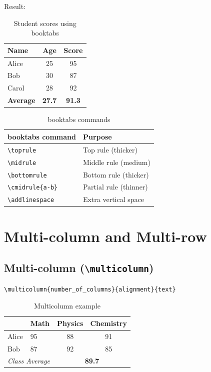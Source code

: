 Result:
\begin{table}[H]
\centering
\begin{tabular}{lcc}
\toprule
\textbf{Name}  & \textbf{Age} & \textbf{Score} \\
\midrule
Alice & 25  & 95 \\
Bob   & 30  & 87 \\
Carol & 28  & 92 \\
\midrule
\textbf{Average} & \textbf{27.7} & \textbf{91.3} \\
\bottomrule
\end{tabular}
\caption{Student scores using booktabs}
\end{table}

\begin{table}[H]
\centering
\begin{tabular}{ll}
\toprule
\textbf{booktabs command} & \textbf{Purpose} \\
\midrule
\verb|\toprule|    & Top rule (thicker) \\
\verb|\midrule|    & Middle rule (medium) \\
\verb|\bottomrule| & Bottom rule (thicker) \\
\verb|\cmidrule{a-b}| & Partial rule (thinner) \\
\verb|\addlinespace|   & Extra vertical space \\
\bottomrule
\end{tabular}
\caption{booktabs commands}
\end{table}

\section{Multi-column and Multi-row}

\subsection{Multi-column (\texttt{\textbackslash multicolumn})}

\begin{lstlisting}[language={[LaTeX]TeX}, caption=Multicolumn]
\multicolumn{number_of_columns}{alignment}{text}
\end{lstlisting}

\begin{table}[H]
\centering
\begin{tabular}{llcc}
\toprule
 & \textbf{Math} & \textbf{Physics} & \textbf{Chemistry} \\
\midrule
Alice  & 95 & 88 & 91 \\
Bob    & 87 & 92 & 85 \\
\midrule
\multicolumn{2}{l}{\textit{Class Average}} & \multicolumn{2}{c}{\textbf{89.7}} \\
\bottomrule
\end{tabular}
\caption{Multicolumn example}
\end{table}

